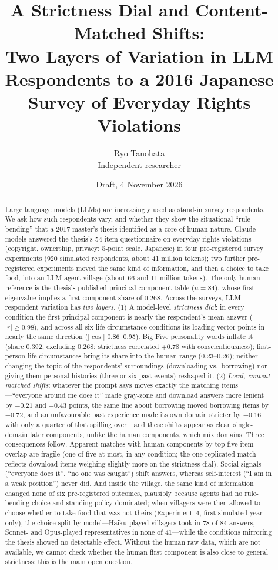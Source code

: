 \documentclass[11pt]{article}
\title{A Strictness Dial and Content-Matched Shifts:\\[2pt]
\large Two Layers of Variation in LLM Respondents to a 2016 Japanese Survey of Everyday Rights Violations}
\author{Ryo Tanohata\\ Independent researcher\\ \texttt{\todo{email}}}
\date{Draft, 4 November 2026}
\begin{document}
\maketitle

\begin{abstract}
Large language models (LLMs) are increasingly used as stand-in survey respondents. We ask how such respondents vary, and whether they show the situational ``rule-bending'' that a 2017 master's thesis identified as a core of human nature. Claude models answered the thesis's 54-item questionnaire on everyday rights violations (copyright, ownership, privacy; 5-point scale, Japanese) in four pre-registered survey experiments (920 simulated respondents, about 41 million tokens); two further pre-registered experiments moved the same kind of information, and then a choice to take food, into an LLM-agent village (about 66 and 11 million tokens). The only human reference is the thesis's published principal-component table ($n = 84$), whose first eigenvalue implies a first-component share of 0.268. Across the surveys, LLM respondent variation has \emph{two layers}. (1) A model-level \emph{strictness dial}: in every condition the first principal component is nearly the respondent's mean answer ($|r| \ge 0.98$), and across all six life-circumstance conditions its loading vector points in nearly the same direction ($|\cos|$ 0.86--0.95). Big Five personality words inflate it (share 0.392, excluding 0.268; strictness correlated $+0.78$ with conscientiousness); first-person life circumstances bring its share into the human range (0.23--0.26); neither changing the topic of the respondents' surroundings (downloading vs.\ borrowing) nor giving them personal histories (three or six past events) reshaped it. (2) \emph{Local, content-matched shifts}: whatever the prompt says moves exactly the matching items---``everyone around me does it'' made gray-zone and download answers more lenient by $-0.21$ and $-0.43$ points, the same line about borrowing moved borrowing items by $-0.72$, and an unfavourable past experience made its own domain stricter by $+0.16$ with only a quarter of that spilling over---and these shifts appear as clean single-domain later components, unlike the human components, which mix domains. Three consequences follow. Apparent matches with human components by top-five item overlap are fragile (one of five at most, in any condition; the one replicated match reflects download items weighing slightly more on the strictness dial). Social signals (``everyone does it'', ``no one was caught'') shift answers, whereas self-interest (``I am in a weak position'') never did. And inside the village, the same kind of information changed none of six pre-registered outcomes, plausibly because agents had no rule-bending choice and standing policy dominated; when villagers were then allowed to choose whether to take food that was not theirs (Experiment~4, first simulated year only), the choice split by model---Haiku-played villagers took in 78 of 84 answers, Sonnet- and Opus-played representatives in none of 41---while the conditions mirroring the thesis showed no detectable effect. Without the human raw data, which are not available, we cannot check whether the human first component is also close to general strictness; this is the main open question.

\end{abstract}
\end{document}
